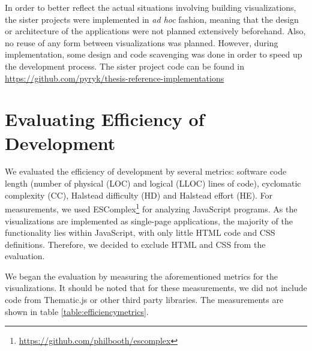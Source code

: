 In order to better reflect the actual situations involving building visualizations, the sister projects were implemented in \emph{ad hoc} fashion, meaning that the design or architecture of the applications were not planned extensively beforehand. Also, no reuse of any form between visualizations was planned. However, during implementation, some design and code scavenging was done in order to speed up the development process. The sister project code can be found in \url{https://github.com/pyryk/thesis-reference-implementations}

\section{Evaluating Efficiency of Development}
\label{section:evaluatingefficiency}

We evaluated the efficiency of development by several metrics: software code length (number of physical (LOC) and logical (LLOC) lines of code), cyclomatic complexity (CC), Halstead difficulty (HD) and Halstead effort (HE). For measurements, we used ESComplex\footnote{\url{https://github.com/philbooth/escomplex}} for analyzing JavaScript programs. As the visualizations are implemented as single-page applications, the majority of the functionality lies within JavaScript, with only little HTML code and CSS definitions. Therefore, we decided to exclude HTML and CSS from the evaluation.

We began the evaluation by measuring the aforementioned metrics for the visualizations. It should be noted that for these measurements, we did not include code from Thematic.js or other third party libraries. The measurements are shown in table \ref{table:efficiencymetrics}.

